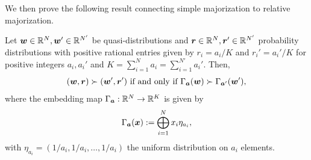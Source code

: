 \documentclass[pra,
aps,
twocolumn,
superscriptaddress,
groupedaddress,
nofootinbib,
reprint
]{revtex4-1}
\begin{document}
We then prove the following result connecting simple majorization to relative majorization.
\begin{lemma}
Let $\boldsymbol{w}\in \mathbb{R}^N, \boldsymbol{w}'\in \mathbb{R}^{N'}$ be quasi-distributions and $\boldsymbol{r}\in \mathbb{R}^N, \boldsymbol{r}'\in \mathbb{R}^{N'}$ probability distributions with positive rational entries given by $r_i = a_i/K$ and $r_i' = a_i'/K$ for positive integers $a_i, a_i'$ and $K = \sum_{i=1}^N a_i = \sum_{i=1}^{N'} a_i'$. 
Then,
\begin{equation}
(\boldsymbol{w}, \boldsymbol{r}) \succ (\boldsymbol{w}', \boldsymbol{r}') \mbox{ if and only if } \Gamma_{\bm{a}} (\boldsymbol{w}) \succ \Gamma_{\bm{a}'} (\boldsymbol{w}'),
\end{equation}
where the embedding map $\Gamma_{\bm{a}} :\mathbb{R}^N \rightarrow \mathbb{R}^K$ is given by
\begin{equation}
	\Gamma_{\bm{a}}(\boldsymbol{x}) := \bigoplus_{i=1}^N x_i \eta_{a_i},
\end{equation}
with $\eta_{a_i} = (1/a_i, 1/a_i, \dots, 1/a_i)$ the uniform distribution on $a_i$ elements.
\end{lemma}
\end{document}
